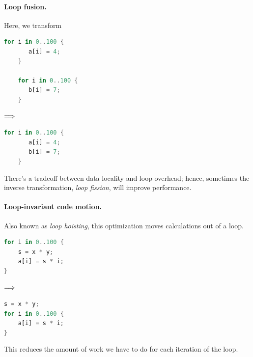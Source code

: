 \paragraph{Loop fusion.} Here, we transform
\begin{center}
\vspace*{-1em}
\begin{minipage}{.3\textwidth}
  \begin{lstlisting}[language=Rust]
    for i in 0..100 {
       a[i] = 4;
    }

    for i in 0..100 {
       b[i] = 7;
    }
  \end{lstlisting}
  \end{minipage} $\Longrightarrow \hspace*{2em}$ \begin{minipage}{.4\textwidth}
  \begin{lstlisting}[language=Rust]
    for i in 0..100 {
       a[i] = 4;
       b[i] = 7;
    }
  \end{lstlisting}
  \end{minipage}
  \end{center}
There's a tradeoff between data locality and loop overhead; hence,
sometimes the inverse transformation, \emph{loop fission}, will
improve performance.

\paragraph{Loop-invariant code motion.} Also known as \emph{loop hoisting},
this optimization moves calculations out of a loop. 
\begin{center}
\vspace*{-1em}
\begin{minipage}{.3\textwidth}
  \begin{lstlisting}[language=Rust]
for i in 0..100 {
    s = x * y;
    a[i] = s * i;
}
  \end{lstlisting}
  \end{minipage} $\Longrightarrow \hspace*{2em}$ \begin{minipage}{.4\textwidth}
  \begin{lstlisting}[language=Rust]
s = x * y;
for i in 0..100 {
    a[i] = s * i;
}
  \end{lstlisting}
  \end{minipage}
  \end{center}

This reduces the amount of work we have to do for each iteration of the loop.


